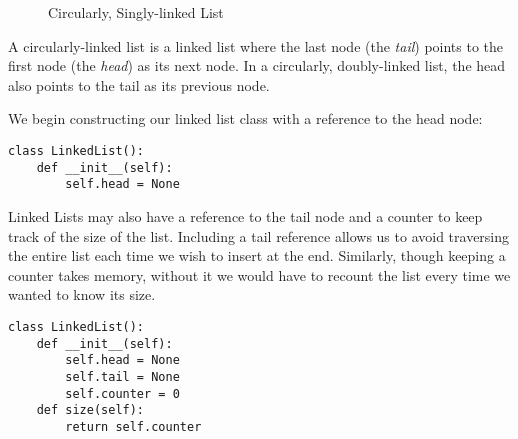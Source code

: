 \begin{figure}[!h]
\centering
{}
\caption{Circularly, Singly-linked List}
\label{Circularly-linked List}
\end{figure}
A circularly-linked list is a linked list where the last node (the \emph{tail}) points to the first node (the \emph{head}) as its next node.
In a circularly, doubly-linked list, the head also points to the tail as its previous node.

We begin constructing our linked list class with a reference to the head node:
\begin{lstlisting}
class LinkedList():
    def __init__(self):
        self.head = None
\end{lstlisting}

Linked Lists may also have a reference to the tail node and a counter to keep track of the size of the list.
Including a tail reference allows us to avoid traversing the entire list each time we wish to insert at the end.
Similarly, though keeping a counter takes memory, without it we would have to recount the list every time we wanted to know its size.
\begin{lstlisting}
class LinkedList():
    def __init__(self):
        self.head = None
        self.tail = None
        self.counter = 0
    def size(self):
        return self.counter
\end{lstlisting}

